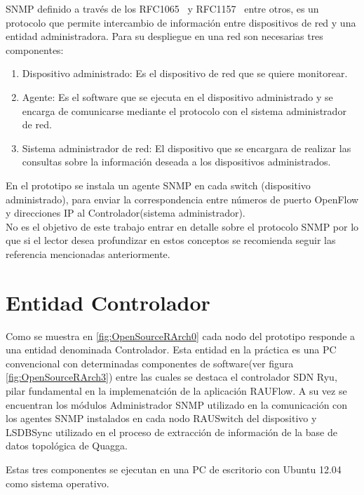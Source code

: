 SNMP definido a través de los RFC1065~\citep{rose1990structure} y RFC1157~\citep{case1989simple} entre otros, es un protocolo que permite intercambio de información entre dispositivos de red y una entidad administradora. Para su despliegue en una red son necesarias tres componentes: 

\begin{enumerate}

\item Dispositivo administrado: Es el dispositivo de red que se quiere monitorear.

\item Agente: Es el software que se ejecuta en el dispositivo administrado y se encarga de comunicarse mediante el protocolo con el sistema administrador de red.

\item Sistema administrador de red: El dispositivo que se encargara de realizar las consultas sobre la información deseada a los dispositivos administrados.

\end{enumerate}	

En el prototipo se instala un agente SNMP en cada switch (dispositivo administrado), para enviar la correspondencia entre números de puerto OpenFlow y direcciones IP al Controlador(sistema administrador).\\

No es el objetivo de este trabajo entrar en detalle sobre el protocolo SNMP por lo que si el lector desea profundizar en estos conceptos se recomienda seguir las referencia mencionadas anteriormente.

\section{Entidad Controlador}
Como se muestra en \ref{fig:OpenSourceRArch0} cada nodo del prototipo responde a una entidad denominada Controlador. Esta entidad en la pr\'actica es una PC convencional con determinadas componentes de software(ver figura \ref{fig:OpenSourceRArch3}) entre las cuales se destaca el controlador SDN Ryu, pilar fundamental en la implemenatci\'on de la aplicaci\'on RAUFlow. A su vez se encuentran los módulos Administrador SNMP utilizado en la comunicaci\'on con los agentes SNMP instalados en cada nodo RAUSwitch del dispositivo y LSDBSync utilizado en el proceso de extracci\'on de informaci\'on de la base de datos topol\'ogica de Quagga. 

Estas tres componentes se ejecutan en una PC de escritorio con Ubuntu 12.04 como sistema operativo. \\

